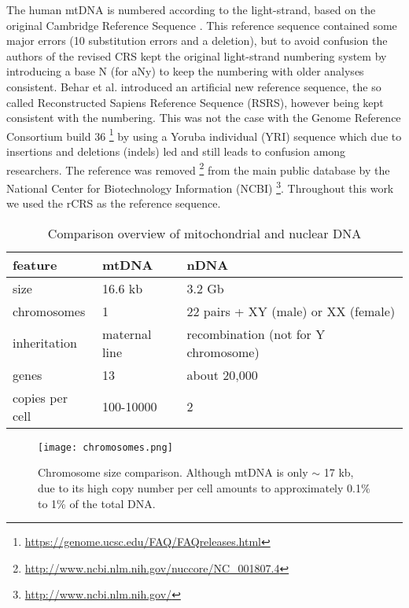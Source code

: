 The human mtDNA is numbered according to the light-strand, based on the original Cambridge Reference Sequence \cite{Anderson1981}. This reference sequence contained some major errors (10 substitution errors and a deletion), but to avoid confusion the authors of the revised CRS \cite{Andrews1999} kept the original light-strand numbering system by introducing a base N (for aNy) to keep the numbering with older analyses consistent. Behar et al. \cite{Behar2012} introduced an artificial new reference sequence, the so called Reconstructed Sapiens Reference Sequence (RSRS), however being kept consistent with the numbering. This was not the case with the Genome Reference Consortium build 36 \footnote{\url{https://genome.ucsc.edu/FAQ/FAQreleases.html}} by using a Yoruba individual (YRI) sequence which due to insertions and deletions (indels) led and still leads to confusion among researchers. The reference was removed \footnote{\url{http://www.ncbi.nlm.nih.gov/nuccore/NC_001807.4}} from the main public database by the National Center for Biotechnology Information (NCBI) \footnote{\url{http://www.ncbi.nlm.nih.gov/}}. Throughout this work we used the rCRS as the reference sequence. 
\begin{table}[ht]
  \begin{tabular}{lll}
     \toprule
    feature  & mtDNA & nDNA \\ 
		\midrule
    size & 16.6 kb & 3.2 Gb  \\ 
		chromosomes & 1 & 22 pairs + XY (male) or XX (female)\\ 
    inheritation & maternal line & recombination (not for Y chromosome) \\ 

		genes & 13 & about 20,000 \\ 
		copies per cell & 100-10000 & 2 \\ 
		\bottomrule
    \end{tabular}
    \caption[Comparison overview mtDNA and nDNA]{Comparison overview of mitochondrial and nuclear DNA }
\end{table}

\begin{figure}[ht]
\begin{center}
\texttt{[image: chromosomes.png]}
\caption[Chromosome size comparison]{Chromosome size comparison. Although mtDNA is only $\sim$ 17 kb, due to its high copy number per cell amounts to approximately 0.1\% to 1\% of the total DNA.}
\label{fig:figureChromosomes}
\end{center}

\end{figure}

